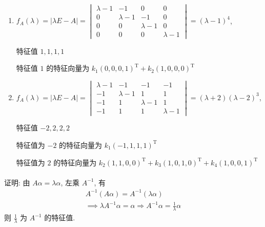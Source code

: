 	 \paragraph{} %
		 \begin{enumerate}
			 \item %
			       \( f_{A}(\lambda) = |\lambda E - A| = \begin{vmatrix}
				       \lambda - 1 & -1          & 0           & 0           \\
				       0           & \lambda - 1 & -1          & 0           \\
				       0           & 0           & \lambda - 1 & 0           \\
				       0           & 0           & 0           & \lambda - 1
			       \end{vmatrix} = (\lambda - 1)^{4} \),

			       特征值 \( 1, 1, 1, 1 \)

			       特征值 \( 1 \) 的特征向量为 \( k_{1}(0, 0, 0, 1)^{\mathrm{T}} + k_{2}(1, 0, 0, 0)^{\mathrm{T}} \)
			 \item %
			       \( f_{A}(\lambda) = |\lambda E - A| = \begin{vmatrix}
				       \lambda - 1 & -1          & -1          & -1        \\
				       -1          & \lambda - 1 & 1           & 1         \\
				       -1          & 1           & \lambda - 1 & 1         \\
				       -1          & 1           & 1           & \lambda-1
			       \end{vmatrix} = (\lambda + 2)(\lambda - 2)^{3} \),

			       特征值 \( -2, 2, 2, 2 \)

			       特征值为 \( -2 \) 的特征向量为 \( k_{1}(-1, 1, 1, 1)^{\mathrm{T}} \)

			       特征值为 \( 2 \) 的特征向量为 \( k_{2}(1, 1, 0, 0)^{\mathrm{T}} + k_{3}(1, 0, 1, 0)^{\mathrm{T}} + k_{4}(1, 0, 0, 1)^{\mathrm{T}} \)
		 \end{enumerate}


	 \paragraph{} %
		 证明: 由 \( A\alpha = \lambda\alpha \), 左乘 \( A^{-1} \), 有
		 \begin{gather*}
			 A^{-1}(A\alpha) = A^{-1}(\lambda\alpha) \\
			 \implies \lambda A^{-1}\alpha = \alpha \Rightarrow A^{-1}\alpha = \frac{1}{\lambda}\alpha
		 \end{gather*}
		 则 \( \frac{1}{\lambda} \) 为 \( A^{-1} \) 的特征值.


